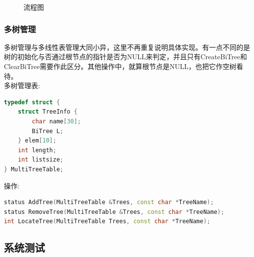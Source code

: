 \documentclass[supercite]{Experimental_Report}
\theoremstyle{definition}
\begin{document}
\begin{figure}[H]
	\centering
	\centering
	\caption{流程图}
	\label{fig6-8}
\end{figure}

\subsubsection{多树管理}
\noindent
多树管理与多线性表管理大同小异，这里不再重复说明具体实现。有一点不同的是树的初始化与否通过根节点的指针是否为NULL来判定，并且只有CreateBiTree和ClearBiTree需要作此区分。其他操作中，就算根节点是NULL，也把它作空树看待。 \\
多树管理表:
\begin{lstlisting}[language=C++, frame=single]
typedef struct {  
    struct TreeInfo {
        char name[30];
        BiTree L;
    } elem[10];
    int length;
    int listsize;
} MultiTreeTable;
\end{lstlisting}
操作:
\begin{lstlisting}[language=C++, frame=single]
status AddTree(MultiTreeTable &Trees, const char *TreeName);
status RemoveTree(MultiTreeTable &Trees, const char *TreeName);
int LocateTree(MultiTreeTable Trees, const char *TreeName);
\end{lstlisting}

\subsection{系统测试}
\end{document}
